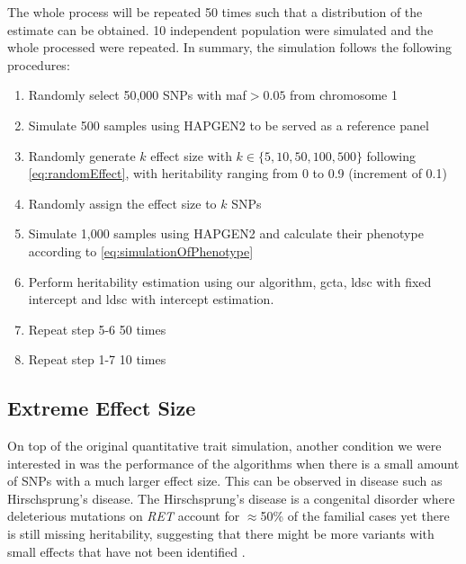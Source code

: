 			The whole process will be repeated 50 times such that a distribution of the estimate can be obtained.
			10 independent population were simulated and the whole processed were repeated.
			In summary, the simulation follows the following procedures:
			\begin{enumerate}
				\item Randomly select 50,000 \glspl{SNP} with \gls{maf}$>0.05$ from chromosome 1
				\item Simulate 500 samples using HAPGEN2 to be served as a reference panel
				\item Randomly generate $k$ effect size with $k \in \{5,10,50,100,500\}$ following \cref{eq:randomEffect}, with heritability ranging from 0 to 0.9 (increment of 0.1)
				\item Randomly assign the effect size to $k$ \glspl{SNP}
				\item Simulate 1,000 samples using HAPGEN2 and calculate their phenotype according to \cref{eq:simulationOfPhenotype}
				\item Perform heritability estimation using our algorithm, \gls{gcta}, \gls{ldsc} with fixed intercept and \gls{ldsc} with intercept estimation.
				\item Repeat step 5-6 50 times
				\item Repeat step 1-7 10 times
			\end{enumerate}
		
		\subsection{Extreme Effect Size}
		On top of the original quantitative trait simulation, another condition we were interested in was the performance of the algorithms when there is a small amount of \glspl{SNP} with a much larger effect size.
		This can be observed in disease such as Hirschsprung's disease.
		The Hirschsprung's disease is a congenital disorder where deleterious mutations on \textit{RET} account for $\approx$50\% of the familial cases yet there is still missing heritability, suggesting that there might be more variants with small effects that have not been identified \citep{Gui2013}.
		
